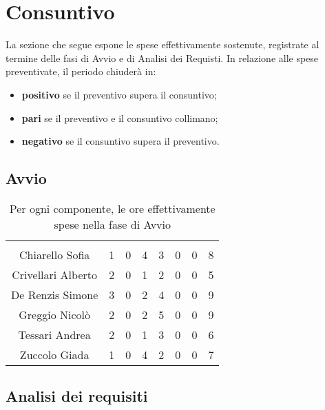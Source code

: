\section{Consuntivo}

La sezione che segue espone le spese effettivamente sostenute, registrate al termine delle fasi di Avvio e di Analisi dei Requisti. In relazione alle spese preventivate, il periodo chiuderà in:
\begin{itemize}
	\item \textbf{positivo} se il preventivo supera il consuntivo;
	\item \textbf{pari} se il preventivo e il consuntivo collimano;
	\item \textbf{negativo} se il consuntivo supera il preventivo.
\end{itemize}


\subsection{Avvio}

\begin{table}[H]
	\begin{center}
		\begin{tabular}{c
				!{\color[HTML]{9b240a}\vrule width 1pt}
				cccccc
				!{\color[HTML]{9b240a}\vrule width 1pt}	
				c}
			\rowcolorhead
			 &  &  &  &  &  &  &  \\
			
			Chiarello Sofia & 1 & 0 & 4 & 3 & 0 & 0 & 8\\
			Crivellari Alberto & 2 & 0 & 1 & 2 & 0 & 0 & 5\\
			De Renzis Simone & 3 & 0 & 2 & 4 & 0 & 0 & 9\\
			Greggio Nicolò & 2 & 0 & 2 & 5 & 0 & 0 & 9\\
			Tessari Andrea & 2 & 0 & 1 & 3 & 0 & 0 & 6\\
			Zuccolo Giada & 1 & 0 & 4 & 2 & 0 & 0 & 7\\
		\end{tabular}
		\caption[Consuntivo fase di Avvio]{Per ogni componente, le ore effettivamente spese nella fase di Avvio}
	\end{center}
\end{table}




\subsection{Analisi dei requisiti}

